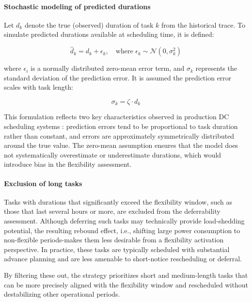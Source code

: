\documentclass[preprint,12pt]{elsarticle}
\makeatletter
\providecommand{\DIFaddtex}[1]{{\protect\color{blue}\uwave{#1}}} %
\providecommand{\DIFdeltex}[1]{{\protect\color{red}\sout{#1}}} %
\providecommand{\DIFaddbegin}{} %
\providecommand{\DIFaddend}{} %
\providecommand{\DIFdelbegin}{} %
\providecommand{\DIFdelend}{} %
\providecommand{\DIFadd}[1]{\texorpdfstring{\DIFaddtex{#1}}{#1}} %
\providecommand{\DIFdel}[1]{\texorpdfstring{\DIFdeltex{#1}}{}} %
\providecommand{\DIFscaledelfig}{0.5}
\newlength{\DIFdelgraphicswidth} %
\newlength{\DIFdelgraphicsheight} %
\providecommand{\DIFaddincludegraphics}[2][]{{\color{blue}\fbox{\DIFOincludegraphics[#1]{#2}}}} %
\providecommand{\DIFdelincludegraphics}[2][]{%
\sbox{\DIFdelgraphicsbox}{\DIFOincludegraphics[#1]{#2}}%
\settoboxwidth{\DIFdelgraphicswidth}{\DIFdelgraphicsbox} %
\settoboxtotalheight{\DIFdelgraphicsheight}{\DIFdelgraphicsbox} %
\scalebox{\DIFscaledelfig}{%
\parbox[b]{\DIFdelgraphicswidth}{\usebox{\DIFdelgraphicsbox}\\[-\baselineskip] \rule{\DIFdelgraphicswidth}{0em}}\llap{\resizebox{\DIFdelgraphicswidth}{\DIFdelgraphicsheight}{%
\setlength{\unitlength}{\DIFdelgraphicswidth}%
\begin{picture}(1,1)%
\thicklines\linethickness{2pt} %
{\color[rgb]{1,0,0}\put(0,0){\framebox(1,1){}}}%
{\color[rgb]{1,0,0}\put(0,0){\line( 1,1){1}}}%
{\color[rgb]{1,0,0}\put(0,1){\line(1,-1){1}}}%
\end{picture}%
}\hspace*{3pt}}} %
} %
\DeclareRobustCommand{\DIFaddbegin}{\DIFOaddbegin \let\includegraphics\DIFaddincludegraphics} %
\DeclareRobustCommand{\DIFaddend}{\DIFOaddend \let\includegraphics\DIFOincludegraphics} %
\DeclareRobustCommand{\DIFdelbegin}{\DIFOdelbegin \let\includegraphics\DIFdelincludegraphics} %
\DeclareRobustCommand{\DIFdelend}{\DIFOaddend \let\includegraphics\DIFOincludegraphics} %
\let\sout@orig\sout %
\renewcommand{\sout}[1]{\ifmmode\text{\sout@orig{\ensuremath{#1}}}\else\sout@orig{#1}\fi} %
\makeatother
\begin{document}
\paragraph{Stochastic modeling of predicted durations}

Let $d_k$ denote the true (observed) duration of task $k$ from the historical trace. To simulate predicted durations available at scheduling time, it is defined:

\begin{equation}
    \hat{d}_k = d_k + \epsilon_k, \quad \text{where } \epsilon_k \sim \mathcal{N}(0, \sigma_k^2)
\end{equation}

where \DIFdelbegin \DIFdel{$\epsilon_i$ }\DIFdelend \DIFaddbegin \DIFadd{$\epsilon_k$ }\DIFaddend is a normally distributed zero-mean error term, and $\sigma_k$ represents the standard deviation of the prediction error. It is assumed the prediction error scales with task length:

\begin{equation}
    \sigma_k = \zeta \cdot d_k
\end{equation}

This formulation reflects two key characteristics observed in production DC scheduling systems \cite{Hu2021, Yeung2022}: prediction errors tend to be proportional to task duration rather than constant, and errors are approximately symmetrically distributed around the true value. The zero-mean assumption ensures that the model does not systematically overestimate or underestimate durations, which would introduce bias in the flexibility assessment. 

\paragraph{Exclusion of long tasks}
Tasks with durations that significantly exceed the flexibility window, such as those that last several hours or more, are excluded from the deferrability assessment. Although deferring such tasks may technically provide load-shedding potential, the resulting rebound effect, i.e., shifting large power consumption to non-flexible periods-makes them less desirable from a flexibility activation perspective. In practice, these tasks are typically scheduled with substantial advance planning and are less amenable to short-notice rescheduling or deferral.

By filtering these out, the strategy prioritizes short and medium-length tasks that can be more precisely aligned with the flexibility window and rescheduled without destabilizing other operational periods.
\end{document}
